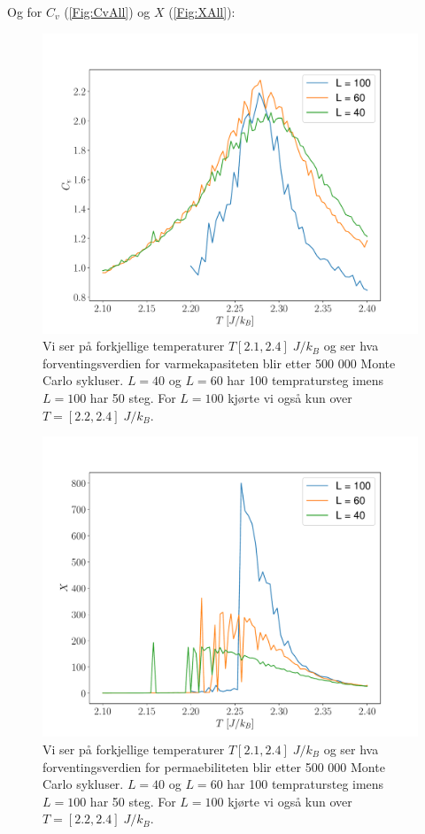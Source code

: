 \documentclass[reprint,english,notitlepage]{revtex4-1}  %
\begin{document}
Og for $C_v$ (\autoref{Fig:CvAll}) og $X$ (\autoref{Fig:XAll}):


\begin{figure}[H]
\centering
\includegraphics[scale=0.4, trim=2.5cm 0 0 0 ]{../Images/CvPerTAll.pdf}
\caption{Vi ser på forkjellige temperaturer $T [2.1, 2.4] \; J/k_B$ og ser hva forventingsverdien for varmekapasiteten blir etter 500 000 Monte Carlo sykluser. $L = 40$ og $L = 60$ har 100 tempratursteg imens $L = 100$ har 50 steg. For $L = 100$ kjørte vi også kun over $ T = [2.2, 2.4] \; J/k_B$.}
\label{Fig:CvAll}
\end{figure}

\begin{figure}[H]
\centering
\includegraphics[scale=0.4, trim=2.5cm 0 0 0 ]{../Images/XPerTAll.pdf}
\caption{Vi ser på forkjellige temperaturer $T [2.1, 2.4] \; J/k_B$ og ser hva forventingsverdien for permaebiliteten blir etter 500 000 Monte Carlo sykluser. $L = 40$ og $L = 60$ har 100 tempratursteg imens $L = 100$ har 50 steg. For $L = 100$ kjørte vi også kun over $ T = [2.2, 2.4] \; J/k_B$.}
\label{Fig:XAll}
\end{figure}
\end{document}
